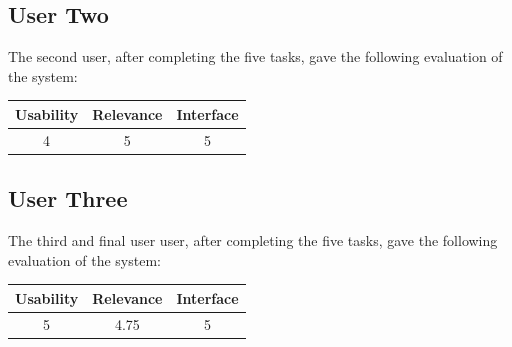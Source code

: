 \documentclass[unicode,11pt,a4paper,oneside,numbers=endperiod,openany]{scrartcl}
\begin{document}
\subsection{User Two}
The second user, after completing the five tasks, gave the following evaluation of the system:

\begin{table}[H]
	\centering
	\begin{tabular}{|c|c|c|} \hline 
		\textbf{Usability} & \textbf{Relevance} & \textbf{Interface}  \\ \hline
		4 & 5 & 5 \\
		\hline
	\end{tabular}
\end{table}

\subsection{User Three}
The third and final user user, after completing the five tasks, gave the following evaluation of the system:

\begin{table}[H]
	\centering
	\begin{tabular}{|c|c|c|} \hline 
		\textbf{Usability} & \textbf{Relevance} & \textbf{Interface}  \\ \hline
		5 & 4.75 & 5 \\
		\hline
	\end{tabular}
\end{table}
\end{document}
